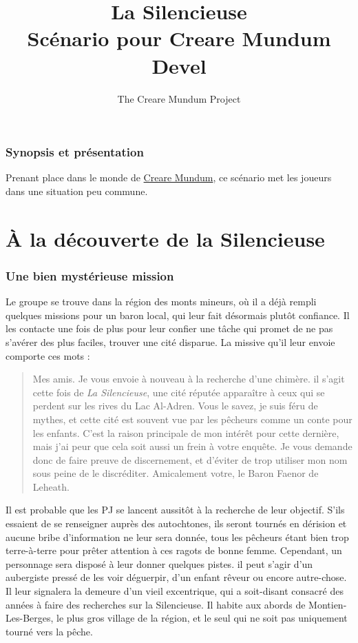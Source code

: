 \documentclass[a4paper, 11pt]{article}
\title{La Silencieuse \\ Scénario pour Creare Mundum \\ Devel}
\author{The Creare Mundum Project}
\date{\oldstylenums{\insertdate}}
\begin{document}
\maketitle
\setcounter{tocdepth}{1} %
\renewcommand{\contentsname}{Sommaire} 
\tableofcontents
\newpage
\section{Synopsis et présentation}
Prenant place dans le monde de {\hyperlink {participation} {Creare Mundum}}, ce scénario met les joueurs dans une situation peu commune. 
\part{À la découverte de la Silencieuse}
\section{Une bien mystérieuse mission}
Le groupe se trouve dans la région des monts mineurs, où il a déjà rempli quelques missions pour un baron local, qui leur fait désormais plutôt confiance. Il les contacte une fois de plus pour leur confier une tâche qui promet de ne pas s'avérer des plus faciles, trouver une cité disparue. La missive qu'il leur envoie comporte ces mots :
\begin{quotation}
Mes amis. 
\newline
Je vous envoie à nouveau à la recherche d'une chimère. il s'agit cette fois de \textit{La Silencieuse}, une cité réputée apparaître à ceux qui se perdent sur les rives du Lac Al-Adren. Vous le savez, je suis féru de mythes, et cette cité est souvent vue par les pêcheurs comme un conte pour les enfants. C'est la raison principale de mon intérêt pour cette dernière, mais j'ai peur que cela soit aussi un frein à votre enquête. Je vous demande donc de faire preuve de discernement, et d'éviter de trop utiliser mon nom sous peine de le discréditer.
\newline
Amicalement votre, le Baron Faenor de Leheath.
\end{quotation}
Il est probable que les PJ se lancent aussitôt à la recherche de leur objectif. S'ils essaient de se renseigner auprès des autochtones, ils seront tournés en dérision et aucune bribe d'information ne leur sera donnée, tous les pêcheurs étant bien trop terre-à-terre pour prêter attention à ces ragots de bonne femme. Cependant, un personnage sera disposé à leur donner quelques pistes. il peut s'agir d'un aubergiste pressé de les voir déguerpir, d'un enfant rêveur ou encore autre-chose. Il leur signalera la demeure d'un vieil excentrique, qui a soit-disant consacré des années à faire des recherches sur la Silencieuse. Il habite aux abords de Montien-Les-Berges, le plus gros village de la région, et le seul qui ne soit pas uniquement tourné vers la pêche. 
\end{document}
